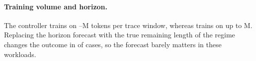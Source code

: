 \paragraph{Training volume and horizon.} The controller trains on --M tokens per trace window, whereas  trains on up to M. Replacing the horizon forecast with the true remaining length of the regime changes the outcome in  of  cases, so the forecast barely matters in these workloads.

\begin{table}[!htbp]
\caption{Pre-declared criteria of the frozen-simulator validation and their outcomes.}
\label{tab:heldout}
\centering\small

\end{table}

\begin{table}[!htbp]
\caption{V2 by burst length: goodput of the controller relative to .}
\label{tab:duration}
\centering\small

\end{table}
